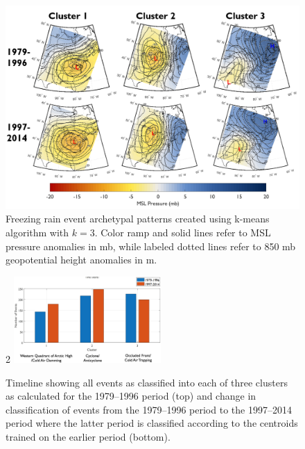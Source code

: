 \documentclass[twocol]{ametsoc}
\begin{document}
\begin{figure}
\centering
\includegraphics[width=\textwidth]{Clusters.PNG}
\caption{\label{fig:clusters} Freezing rain event archetypal patterns created using k-means algorithm with $k=3$. Color ramp and solid lines refer to MSL pressure anomalies in mb, while labeled dotted lines refer to 850 mb geopotential height anomalies in m.}
\end{figure}

\begin{figure}2
\centering
\includegraphics[width=0.5\textwidth]{Storm_Pattern_Change.png}
\caption{\label{fig:clusterchange} Timeline showing all events as classified into each of three clusters as calculated for the 1979--1996 period (top) and change in classification of events from the 1979--1996 period to the 1997--2014 period where the latter period is classified according to the centroids trained on the earlier period (bottom).}
\end{figure}
\end{document}
